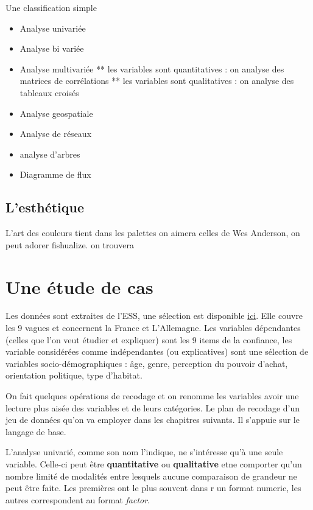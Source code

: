 \documentclass[
]{book}
\providecommand{\tightlist}{%
  \setlength{\itemsep}{0pt}\setlength{\parskip}{0pt}}
\begin{document}
Une classification simple

\begin{itemize}
\tightlist
\item
  Analyse univariée
\item
  Analyse bi variée
\item
  Analyse multivariée
  ** les variables sont quantitatives : on analyse des matrices de corrélations
  ** les variables sont qualitatives : on analyse des tableaux croisés
\item
  Analyse geospatiale
\item
  Analyse de réseaux
\item
  analyse d'arbres
\item
  Diagramme de flux
\end{itemize}

\hypertarget{lesthuxe9tique}{%
\subsection{L'esthétique}\label{lesthuxe9tique}}

L'art des couleurs tient dans les palettes on aimera celles de Wes Anderson, on peut adorer fishualize. on trouvera

\hypertarget{une-uxe9tude-de-cas}{%
\section{Une étude de cas}\label{une-uxe9tude-de-cas}}

Les données sont extraites de l'ESS, une sélection est disponible \href{}{ici}. Elle couvre les 9 vagues et concernent la France et L'Allemagne. Les variables dépendantes (celles que l'on veut étudier et expliquer) sont les 9 items de la confiance, les variable considérées comme indépendantes (ou explicatives) sont une sélection de variables socio-démographiques : âge, genre, perception du pouvoir d'achat, orientation politique, type d'habitat.

On fait quelques opérations de recodage et on renomme les variables avoir une lecture plus aisée des variables et de leurs catégories. Le plan de recodage d'un jeu de données qu'on va employer dans les chapitres suivants. Il s'appuie sur le langage de base.

L'analyse univarié, comme son nom l'indique, ne s'intéresse qu'à une seule variable. Celle-ci peut être \textbf{quantitative} ou \textbf{qualitative} etne comporter qu'un nombre limité de modalités entre lesquels aucune comparaison de grandeur ne peut être faite. Les premières ont le plus souvent dans r un format numeric, les autres correspondent au format \emph{factor}.
\end{document}
